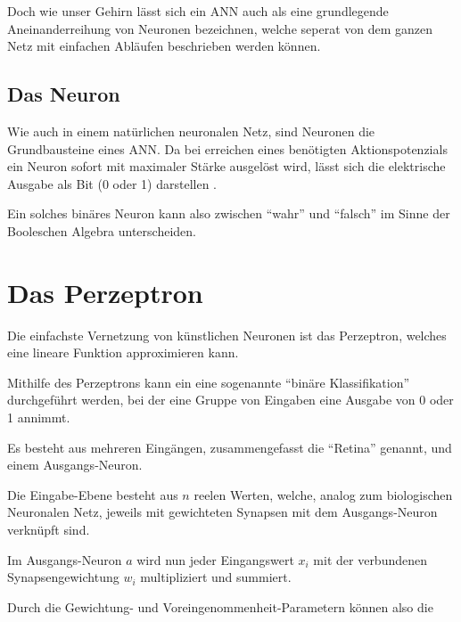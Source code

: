 \documentclass[12pt,titlepage]{article}
\begin{document}
Doch wie unser Gehirn lässt sich ein ANN auch als eine grundlegende Aneinanderreihung von Neuronen bezeichnen, welche seperat von dem ganzen Netz mit einfachen Abläufen beschrieben werden können.

\subsection{Das Neuron}

Wie auch in einem natürlichen neuronalen Netz, sind Neuronen die Grundbausteine eines ANN. Da bei erreichen eines benötigten Aktionspotenzials ein Neuron sofort mit maximaler Stärke ausgelöst wird, lässt sich die elektrische Ausgabe als Bit (0 oder 1) darstellen \autocite{mccullochLogicalCalculusIdeas1943}.


Ein solches binäres Neuron kann also zwischen \enquote{wahr} und \enquote{falsch} im Sinne der Booleschen Algebra unterscheiden.


\section{Das Perzeptron}

Die einfachste Vernetzung von künstlichen Neuronen ist das Perzeptron, welches eine lineare Funktion approximieren kann.



Mithilfe des Perzeptrons kann ein eine sogenannte \enquote{binäre Klassifikation} durchgeführt werden, bei der eine Gruppe von Eingaben eine Ausgabe von 0 oder 1 annimmt.

Es besteht aus mehreren Eingängen, zusammengefasst die \enquote{Retina} genannt, und einem Ausgangs-Neuron.

Die Eingabe-Ebene besteht aus $n$ reelen Werten, welche, analog zum biologischen Neuronalen Netz, jeweils mit gewichteten Synapsen mit dem Ausgangs-Neuron verknüpft sind.

Im Ausgangs-Neuron $a$ wird nun jeder Eingangswert $x_i$ mit der verbundenen Synapsengewichtung $w_i$ multipliziert und summiert.


Durch die Gewichtung- und Voreingenommenheit-Parametern können also die

\end{document}
